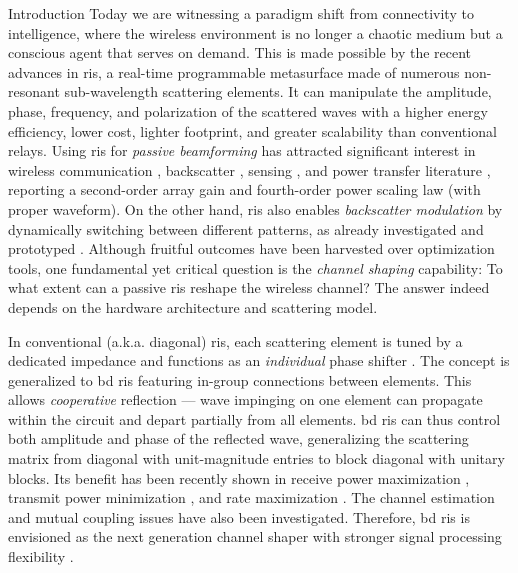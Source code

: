 \documentclass[journal]{IEEEtran}
\begin{document}
\glsresetall

\begin{section}{Introduction}
	Today we are witnessing a paradigm shift from {connectivity} to {intelligence}, where the wireless environment is no longer a chaotic medium but a conscious agent that serves on demand.
	This is made possible by the recent advances in \gls{ris}, a real-time programmable metasurface made of numerous non-resonant sub-wavelength scattering elements.
	It can manipulate the amplitude, phase, frequency, and polarization of the scattered waves \cite{Basar2019} with a higher energy efficiency, lower cost, lighter footprint, and greater scalability than conventional relays.
	Using \gls{ris} for \emph{passive beamforming} has attracted significant interest in wireless communication \cite{Wu2019,Wu2020c,Yang2020,Zheng2021}, backscatter \cite{Jia2020,Liang2022}, sensing \cite{Liu2022a,Hua2023}, and power transfer literature \cite{Wu2021d,Feng2022,Zhao2022}, reporting a second-order array gain and fourth-order power scaling law (with proper waveform).
	On the other hand, \gls{ris} also enables \emph{backscatter modulation} by dynamically switching between different patterns, as already investigated \cite{Karasik2020,Basar2020,Zhao2022a} and prototyped \cite{Tang2019a,Dai2020a}.
	Although fruitful outcomes have been harvested over optimization tools, one fundamental yet critical question is the \emph{channel shaping} capability: To what extent can a passive \gls{ris} reshape the wireless channel?
	The answer indeed depends on the hardware architecture and scattering model.

	In conventional (a.k.a. diagonal) \gls{ris}, each scattering element is tuned by a dedicated impedance and functions as an \emph{individual} phase shifter \cite{Wu2020}.
	The concept is generalized to \gls{bd} \gls{ris} \cite{Shen2020a,Li2023b} featuring in-group connections between elements.
	This allows \emph{cooperative} reflection --- wave impinging on one element can propagate within the circuit and depart partially from all elements.
	\gls{bd} \gls{ris} can thus control both amplitude and phase of the reflected wave, generalizing the scattering matrix from diagonal with unit-magnitude entries to block diagonal with  unitary blocks.
	Its benefit has been recently shown in receive power maximization \cite{Nerini2023,Santamaria2023,Fang2023,Nerini2023a}, transmit power minimization \cite{Zhou2023}, and rate maximization \cite{Zhou2023,Nerini2023a,Li2023d,Bartoli2023,Li2023c}.
	The channel estimation \cite{Li2023e} and mutual coupling \cite{Li2023f} issues have also been investigated.
	Therefore, \gls{bd} \gls{ris} is envisioned as the next generation channel shaper with stronger signal processing flexibility \cite{Li2023g}.


\end{section}
\end{document}
